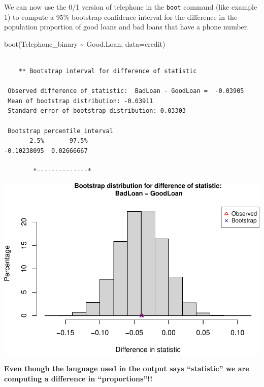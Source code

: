 \documentclass[
]{book}
\newenvironment{Shaded}{\begin{snugshade}}{\end{snugshade}}
\newcommand{\AttributeTok}[1]{\textcolor[rgb]{0.77,0.63,0.00}{#1}}
\newcommand{\FunctionTok}[1]{\textcolor[rgb]{0.00,0.00,0.00}{#1}}
\newcommand{\NormalTok}[1]{#1}
\newcommand{\SpecialCharTok}[1]{\textcolor[rgb]{0.00,0.00,0.00}{#1}}
\begin{document}
We can now use the 0/1 version of telephone in the \texttt{boot} command (like example 1) to compute a 95\% bootstrap confidence interval for the difference in the population proportion of good loans and bad loans that have a phone number.

\begin{Shaded}
\begin{Highlighting}[]
\FunctionTok{boot}\NormalTok{(Telephone\_binary }\SpecialCharTok{\textasciitilde{}}\NormalTok{ Good.Loan, }\AttributeTok{data=}\NormalTok{credit)}
\end{Highlighting}
\end{Shaded}

\begin{verbatim}

    ** Bootstrap interval for difference of statistic

 Observed difference of statistic:  BadLoan - GoodLoan =  -0.03905 
 Mean of bootstrap distribution: -0.03911 
 Standard error of bootstrap distribution: 0.03303 

 Bootstrap percentile interval
       2.5%       97.5% 
-0.10238095  0.02666667 

        *--------------*
\end{verbatim}

\includegraphics[width=1\linewidth]{Class_Activity_8_files/figure-latex/unnamed-chunk-14-1}

\textbf{Even though the language used in the output says ``statistic'' we are computing a difference in ``proportions''!!}
\end{document}
